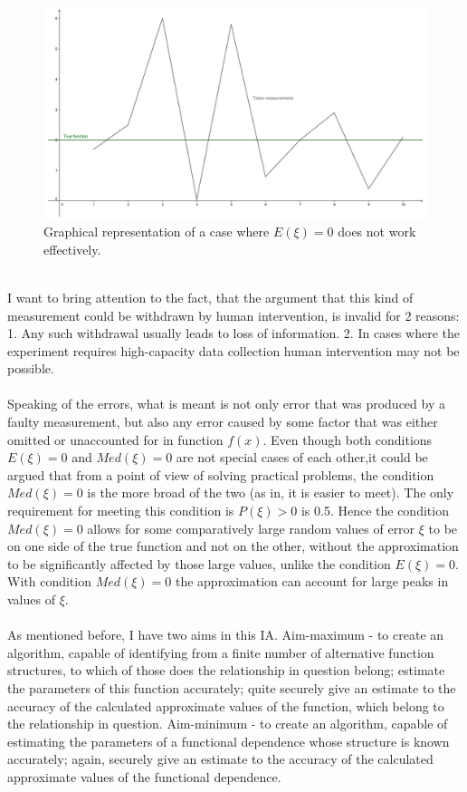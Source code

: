 \documentclass[a4paper]{article}
\numberwithin{equation}{subsection}
\begin{document}
\begin{figure}[h!]
\includegraphics[scale=0.1]{pic-naturallimits}
\centering
\caption{Graphical representation of a case where $E(\xi)=0$ does not work effectively.}
\label{fig:graph-nl}
\end{figure}
\\
I want to bring attention to the fact, that the argument that this kind of measurement could be withdrawn by human intervention, is invalid for 2 reasons: 1. Any such withdrawal usually leads to loss of information. 2. In cases where the experiment requires high-capacity data collection human intervention may not be possible.\\
\\
Speaking of the errors, what is meant is not only error that was produced by a faulty measurement, but also any error caused by some factor that was either omitted or unaccounted for in function $f(x)$. Even though both conditions $E(\xi)=0$ and $Med(\xi)=0$ are not special cases of each other,it could be argued that from a point of view of solving practical problems, the condition $Med(\xi)=0$ is the more broad of the two (as in, it is easier to meet). The only requirement for meeting this condition is $P(\xi)>0$ is 0.5.  Hence the condition $Med(\xi)=0$ allows for some comparatively large random values of error $\xi$ to be on one side of the true function and not on the other, without the approximation to be significantly affected by those large values, unlike the condition $E(\xi)=0$. With condition $Med(\xi)=0$ the approximation can account for large peaks in values of $\xi$.\\
\\
As mentioned before, I have two aims in this IA. Aim-maximum - to create an algorithm, capable of identifying from a finite number of alternative function structures, to which of those does the relationship in question belong; estimate the parameters of this function accurately; quite securely give an estimate to the accuracy of the calculated approximate values of the function, which belong to the relationship in question. Aim-minimum - to create an algorithm, capable of estimating the parameters of a functional dependence whose structure is known accurately; again, securely give an estimate to the accuracy of the calculated approximate values of the functional dependence. \\
\end{document}
